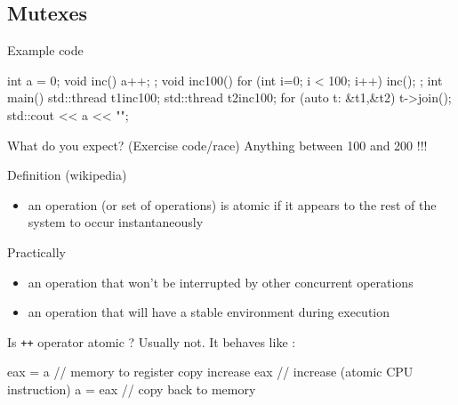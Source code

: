 \subsection[mutex]{Mutexes}

\begin{frame}[fragile]
  \begin{exampleblock}{Example code }
    \begin{cppcode*}{}
      int a = 0;
      void inc() { a++; };
      void inc100() {
        for (int i=0; i < 100; i++) inc();
      };
      int main() {
        std::thread t1{inc100};
        std::thread t2{inc100};
        for (auto t: {&t1,&t2}) t->join();
        std::cout << a << "\n";
      }
    \end{cppcode*}
  \end{exampleblock}
  \pause
  \begin{block}{What do you expect? (Exercise code/race)}
    \pause
    Anything between 100 and 200 !!!
  \end{block}
\end{frame}

\begin{frame}[fragile]
  \begin{exampleblock}{Definition (wikipedia)}
    \begin{itemize}
    \item an operation (or set of operations) is atomic if it appears to the rest of the system to occur instantaneously
    \end{itemize}
  \end{exampleblock}
  \begin{block}{Practically}
    \begin{itemize}
    \item an operation that won't be interrupted by other concurrent operations
    \item an operation that will have a stable environment during execution
    \end{itemize}
  \end{block}
  \pause
  \begin{alertblock}{Is \texttt{++} operator atomic ?}
    \pause
    Usually not. It behaves like :
    \begin{cppcode*}{}
      eax = a       // memory to register copy
      increase eax  // increase (atomic CPU instruction)
      a = eax       // copy back to memory
    \end{cppcode*}
  \end{alertblock}
\end{frame}

